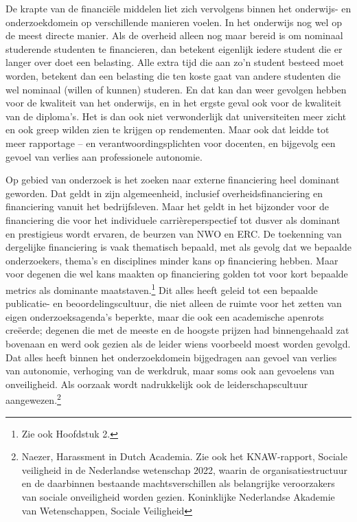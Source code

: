 \documentclass{jote-book}
\begin{document}
	De krapte van de financiële middelen liet zich vervolgens binnen het onderwijs- en onderzoekdomein op verschillende manieren voelen. In het onderwijs nog wel op de meest directe manier. Als de overheid alleen nog maar bereid is om nominaal studerende studenten te financieren, dan betekent eigenlijk iedere student die er langer over doet een belasting. Alle extra tijd die aan zo'n student besteed moet worden, betekent dan een belasting die ten koste gaat van andere studenten die wel nominaal (willen of kunnen) studeren. En dat kan dan weer gevolgen hebben voor de kwaliteit van het onderwijs, en in het ergste geval ook voor de kwaliteit van de diploma's. Het is dan ook niet verwonderlijk dat universiteiten meer zicht en ook greep wilden zien te krijgen op rendementen. Maar ook dat leidde tot meer rapportage -- en verantwoordingsplichten voor docenten, en bijgevolg een gevoel van verlies aan professionele autonomie.



	Op gebied van onderzoek is het zoeken naar externe financiering heel dominant geworden. Dat geldt in zijn algemeenheid, inclusief overheidsfinanciering en financiering vanuit het bedrijfsleven. Maar het geldt in het bijzonder voor de financiering die voor het individuele carrièreperspectief tot dusver als dominant en prestigieus wordt ervaren, de beurzen van NWO en ERC. De toekenning van dergelijke financiering is vaak thematisch bepaald, met als gevolg dat we bepaalde onderzoekers, thema's en disciplines minder kans op financiering hebben. Maar voor degenen die wel kans maakten op financiering golden tot voor kort bepaalde metrics als dominante maatstaven.\footnote{Zie ook Hoofdstuk 2. } Dit alles heeft geleid tot een bepaalde publicatie- en beoordelingscultuur, die niet alleen de ruimte voor het zetten van eigen onderzoeksagenda's beperkte, maar die ook een academische apenrots creëerde; degenen die met de meeste en de hoogste prijzen had binnengehaald zat bovenaan en werd ook gezien als de leider wiens voorbeeld moest worden gevolgd. Dat alles heeft binnen het onderzoekdomein bijgedragen aan gevoel van verlies van autonomie, verhoging van de werkdruk, maar soms ook aan gevoelens van onveiligheid. Als oorzaak wordt nadrukkelijk ook de leiderschapscultuur aangewezen.\footnote{Naezer, Harassment in Dutch Academia. Zie ook het KNAW-rapport, Sociale veiligheid in de Nederlandse wetenschap 2022, waarin de organisatiestructuur en de daarbinnen bestaande machtsverschillen als belangrijke veroorzakers van sociale onveiligheid worden gezien. Koninklijke Nederlandse Akademie van Wetenschappen, Sociale Veiligheid}
\end{document}
